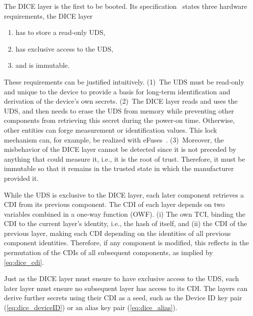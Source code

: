 The DICE layer is the first to be booted.
Its specification~\cite{dice-hardware-reqs} states three hardware requirements, the DICE layer 
\begin{enumerate}
  \item has to store a read-only \ac{UDS},
  \item has exclusive access to the \ac{UDS},
  \item and is immutable.
\end{enumerate}
These requirements can be justified intuitively.
(1)~The \ac{UDS} must be read-only and unique to the device to provide a basis for long-term identification and derivation of the device's own secrets.
(2)~The DICE layer reads and uses the \ac{UDS}, and then needs to erase the \ac{UDS} from memory while preventing other components from retrieving this secret during the power-on time.
Otherwise, other entities can forge measurement or identification values. This lock mechanism can, for example, be realized with eFuses~\cite{dice-hardware-reqs}.
(3)~Moreover, the misbehavior of the DICE layer cannot be detected since it is not preceded by anything that could measure it, i.e., it is the root of trust.
Therefore, it must be immutable so that it remains in the trusted state in which the manufacturer provided it.


While the \ac{UDS} is exclusive to the DICE layer, each later component retrieves a \ac{CDI} from its previous component.
The \ac{CDI} of each layer depends on two variables combined in a one-way function (OWF).
(i) The own TCI, binding the \ac{CDI} to the current layer's identity, i.e., the hash of itself, and (ii) the \ac{CDI} of the previous layer, making each \ac{CDI} depending on the identities of all previous component identities.
Therefore, if any component is modified, this reflects in the permutation of the \acp{CDI} of all subsequent components, as implied by \autoref{eq:dice_cdi}.


Just as the DICE layer must ensure to have exclusive access to the \ac{UDS}, each later layer must ensure no subsequent layer has access to its \ac{CDI}\@.
The layers can derive further secrets using their \ac{CDI} as a seed, such as the Device ID key pair (\autoref{eq:dice_deviceID}) or an alias key pair (\autoref{eq:dice_alias}).

